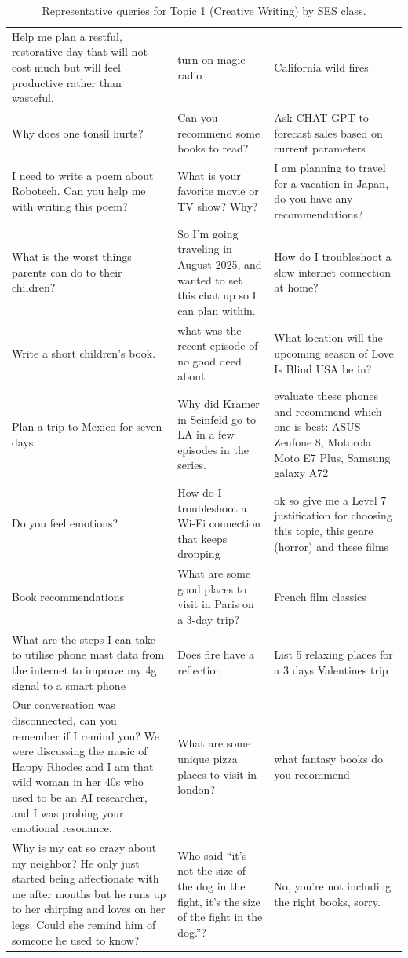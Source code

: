 \begin{table}[ht]
\begin{tabular}{p{4.3cm}p{4.3cm}p{4.3cm}}
Help me plan a restful, restorative day that will not cost much but will feel productive rather than wasteful. & turn on  magic radio & California wild fires \\[4pt]
Why does one tonsil hurts? & Can you recommend some books to read? & Ask CHAT GPT to forecast sales based on current parameters \\[4pt]
I need to write a poem about Robotech. Can you help me with writing this poem? & What is your favorite movie or TV show? Why? & I am planning to travel for a vacation in Japan, do you have any recommendations? \\[4pt]
What is the worst things parents can do to their children? & So I'm going traveling in August 2025, and wanted to set this chat up so I can plan within. & How do I troubleshoot a slow internet connection at home? \\[4pt]
Write a short children’s book. & what was the recent episode of no good deed about & What location will the upcoming season of Love Is Blind USA be in? \\[4pt]
Plan a trip to Mexico for seven days & Why did Kramer in Seinfeld go to LA in a few episodes in the series. & evaluate these phones and recommend which one is best: ASUS Zenfone 8, Motorola Moto E7 Plus, Samsung galaxy A72 \\[4pt]
Do you feel emotions? & How do I troubleshoot a Wi-Fi connection that keeps dropping & ok so give me a Level 7 justification for choosing this topic, this genre (horror) and these films \\[4pt]
Book recommendations & What are some good places to visit in Paris on a 3-day trip? & French film classics \\[4pt]
What are the steps I can take to utilise phone mast data from the internet to improve my 4g signal to a smart phone & Does fire have a reflection & List 5 relaxing places for a 3 days Valentines trip \\[4pt]
Our conversation was disconnected, can you remember if I remind you? We were discussing the music of Happy Rhodes and I am that wild woman in her 40s who used to be an AI researcher, and I was probing your emotional resonance. & What are some unique pizza places to visit in london? & what fantasy books do you recommend \\[4pt]
Why is my cat so crazy about my neighbor? He only just started being affectionate with me after months but he runs up to her chirping and loves on her legs.  Could she remind him of someone he used to know? & Who said “it’s not the size of the dog in the fight, it’s the size of the fight in the dog.”? & No, you're not including the right books, sorry. \\[4pt]
\bottomrule
\end{tabular}
\caption{Representative queries for Topic 1 (Creative Writing) by SES class.}
\label{tab:repr_queries_topic1}
\end{table}

